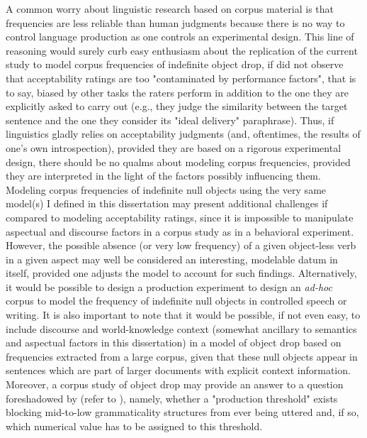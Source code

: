 A common worry about linguistic research based on corpus material is that frequencies are less reliable than human judgments because there is no way to control language production as one controls an experimental design. This line of reasoning would surely curb easy enthusiasm about the replication of the current study to model corpus frequencies of indefinite object drop, if \textcite{Steube2008, Schutze2016} did not observe that acceptability ratings are too "contaminated by performance factors", that is to say, biased by other tasks the raters perform in addition to the one they are explicitly asked to carry out (e.g., they judge the similarity between the target sentence and the one they consider its "ideal delivery" paraphrase). Thus, if linguistics gladly relies on acceptability judgments (and, oftentimes, the results of one's own introspection), provided they are based on a rigorous experimental design, there should be no qualms about modeling corpus frequencies, provided they are interpreted in the light of the factors possibly influencing them.\\
Modeling corpus frequencies of indefinite null objects using the very same model(s) I defined in this dissertation may present additional challenges if compared to modeling acceptability ratings, since it is impossible to manipulate aspectual and discourse factors in a corpus study as in a behavioral experiment. However, the possible absence (or very low frequency) of a given object-less verb in a given aspect may well be considered an interesting, modelable datum in itself, provided one adjusts the model to account for such findings. Alternatively, it would be possible to design a production experiment to design an \textit{ad-hoc} corpus to model the frequency of indefinite null objects in controlled speech or writing. It is also important to note that it would be possible, if not even easy, to include discourse and world-knowledge context (somewhat ancillary to semantics and aspectual factors in this dissertation) in a model of object drop based on frequencies extracted from a large corpus, given that these null objects appear in sentences which are part of larger documents with explicit context information. Moreover, a corpus study of object drop may provide an answer to a question foreshadowed by \textcite{KempenHarbusch2005, Medina2007} (refer to ), namely, whether a "production threshold" exists blocking mid-to-low grammaticality structures from ever being uttered and, if so, which numerical value has to be assigned to this threshold.


